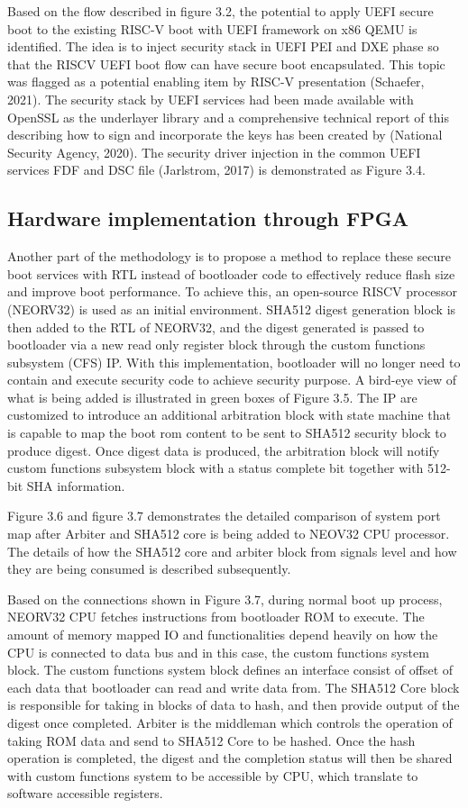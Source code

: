 \documentclass[a4paper,fleqn]{cas-dc}
\begin{document}
Based on the flow described in figure 3.2, the potential to apply UEFI secure boot to the existing RISC-V boot with UEFI framework on x86 QEMU is identified. The idea is to inject security stack in UEFI PEI and DXE phase so that the RISCV UEFI boot flow can have secure boot encapsulated. This topic was flagged as a potential enabling item by RISC-V presentation (Schaefer, 2021). The security stack by UEFI services had been made available with OpenSSL as the underlayer library and a comprehensive technical report of this describing how to sign and incorporate the keys has been created by (National Security Agency, 2020). The security driver injection in the common UEFI services FDF and DSC file (Jarlstrom, 2017) is demonstrated as Figure 3.4.


\subsection{ Hardware implementation through FPGA}
Another part of the methodology is to propose a method to replace these secure boot services with RTL instead of bootloader code to effectively reduce flash size and improve boot performance. To achieve this, an open-source RISCV processor (NEORV32) is used as an initial environment. SHA512 digest generation block is then added to the RTL of NEORV32, and the digest generated is passed to bootloader via a new read only register block through the custom functions subsystem (CFS) IP. With this implementation, bootloader will no longer need to contain and execute security code to achieve security purpose. A bird-eye view of what is being added is illustrated in green boxes of Figure 3.5. The IP are customized to introduce an additional arbitration block with state machine that is capable to map the boot rom content to be sent to SHA512 security block to produce digest. Once digest data is produced, the arbitration block will notify custom functions subsystem block with a status complete bit together with 512-bit SHA information. 



Figure 3.6 and figure 3.7 demonstrates the detailed comparison of system port map after Arbiter and SHA512 core is being added to NEOV32 CPU processor. The details of how the SHA512 core and arbiter block from signals level and how they are being consumed is described subsequently.

Based on the connections shown in Figure 3.7, during normal boot up process, NEORV32 CPU fetches instructions from bootloader ROM to execute. The amount of memory mapped IO and functionalities depend heavily on how the CPU is connected to data bus and in this case, the custom functions system block. The custom functions system block defines an interface consist of offset of each data that bootloader can read and write data from. The SHA512 Core block is responsible for taking in blocks of data to hash, and then provide output of the digest once completed. Arbiter is the middleman which controls the operation of taking ROM data and send to SHA512 Core to be hashed. Once the hash operation is completed, the digest and the completion status will then be shared with custom functions system to be accessible by CPU, which translate to software accessible registers.
\end{document}
